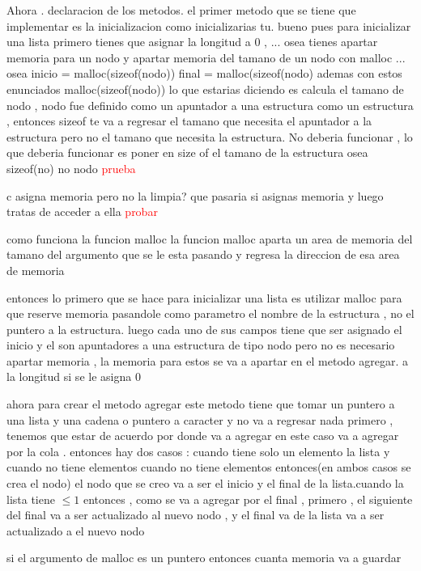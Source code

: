 \documentclass[12p]{article}
\newcommand{\rojo}[1]{
  \textcolor{red}{#1}
  }
\begin{document}
Ahora . declaracion de los metodos.
el primer metodo que se tiene que implementar es la inicializacion
como inicializarias tu. bueno pues para inicializar una lista primero tienes que asignar la longitud a 0 , ... osea tienes apartar memoria
para un nodo y apartar memoria del tamano de un nodo con malloc ...
osea inicio = malloc(sizeof(nodo))
final = malloc(sizeof(nodo)
ademas con estos enunciados malloc(sizeof(nodo)) lo que estarias diciendo es calcula el tamano de nodo , nodo fue definido como un apuntador
a una estructura como un estructura , entonces sizeof te va a regresar el tamano que necesita el apuntador a la estructura
pero no el tamano que necesita la estructura. No deberia funcionar , lo que deberia funcionar es poner en size of el tamano de la estructura
osea sizeof(no) no nodo \rojo{prueba}

c asigna memoria pero no la limpia?
que pasaria si asignas memoria y luego tratas de acceder a ella \rojo{probar}

como funciona la funcion malloc
la funcion malloc aparta un area de memoria del tamano del argumento que se le esta pasando y regresa la direccion de esa
area de memoria 

entonces lo primero que se hace para inicializar una lista es
utilizar malloc para que reserve memoria pasandole como parametro
el nombre de la estructura , no el puntero a la estructura.
luego cada uno de sus campos tiene que ser asignado
el inicio y el son apuntadores a una estructura de tipo nodo
pero no es necesario apartar memoria , la memoria para estos se
va a apartar en el metodo agregar. a la longitud si se le asigna 0

ahora para crear el metodo agregar
este metodo tiene que tomar un puntero a una lista y una cadena o
puntero a caracter y no va a regresar nada
primero , tenemos que estar de acuerdo por donde va a agregar
en este caso va a agregar por la cola .
entonces hay dos casos : cuando tiene solo un elemento la lista
y cuando no tiene elementos
cuando no tiene elementos entonces(en ambos casos se crea el nodo)
el nodo que se creo va a ser el inicio y el final de la lista.cuando
la lista tiene $\leq 1$ entonces , como se va a agregar por el final ,
primero , el siguiente del final va a ser actualizado al nuevo nodo ,
y el final va de la lista va a ser actualizado a el nuevo nodo 

si el argumento de malloc es un puntero entonces cuanta memoria va
a guardar
\end{document}
